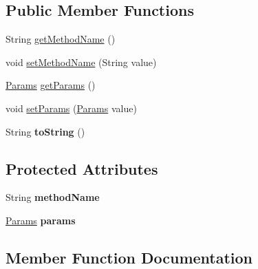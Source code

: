 \subsection*{Public Member Functions}
\begin{DoxyCompactItemize}
\item 
String \mbox{\hyperlink{classcom_1_1mysql_1_1fabric_1_1xmlrpc_1_1base_1_1_method_call_ae09ae5705439a517e8f400cab2cc5383}{get\+Method\+Name}} ()
\item 
void \mbox{\hyperlink{classcom_1_1mysql_1_1fabric_1_1xmlrpc_1_1base_1_1_method_call_a785077c0b9f65f52851a33d886b36847}{set\+Method\+Name}} (String value)
\item 
\mbox{\hyperlink{classcom_1_1mysql_1_1fabric_1_1xmlrpc_1_1base_1_1_params}{Params}} \mbox{\hyperlink{classcom_1_1mysql_1_1fabric_1_1xmlrpc_1_1base_1_1_method_call_aafc8769037870481166c2b9399a59b39}{get\+Params}} ()
\item 
void \mbox{\hyperlink{classcom_1_1mysql_1_1fabric_1_1xmlrpc_1_1base_1_1_method_call_ac16d181c5296e8beecbf82c9f6b0c72f}{set\+Params}} (\mbox{\hyperlink{classcom_1_1mysql_1_1fabric_1_1xmlrpc_1_1base_1_1_params}{Params}} value)
\item 
\mbox{\label{classcom_1_1mysql_1_1fabric_1_1xmlrpc_1_1base_1_1_method_call_afcb3693140aac97b165e34e00159e772}} 
String {\bfseries to\+String} ()
\end{DoxyCompactItemize}
\subsection*{Protected Attributes}
\begin{DoxyCompactItemize}
\item 
\mbox{\label{classcom_1_1mysql_1_1fabric_1_1xmlrpc_1_1base_1_1_method_call_aefe2f3f344a35f21db8d764297cc55be}} 
String {\bfseries method\+Name}
\item 
\mbox{\label{classcom_1_1mysql_1_1fabric_1_1xmlrpc_1_1base_1_1_method_call_ac44c08467ef7cc31f175c7afe6817556}} 
\mbox{\hyperlink{classcom_1_1mysql_1_1fabric_1_1xmlrpc_1_1base_1_1_params}{Params}} {\bfseries params}
\end{DoxyCompactItemize}


\subsection{Member Function Documentation}
\mbox{\label{classcom_1_1mysql_1_1fabric_1_1xmlrpc_1_1base_1_1_method_call_ae09ae5705439a517e8f400cab2cc5383}} 
